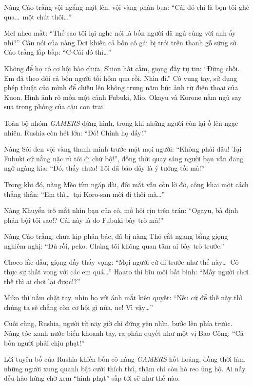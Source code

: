 \documentclass[../main.tex]{subfiles}
\begin{document}
Nàng Cáo trắng vội ngẩng mặt lên, vội vàng phân bua: ``Cái đó chỉ là bọn tôi ghé qua\dots\ một chút thôi\dots''

Mel nheo mắt: ``Thế sao tôi lại nghe nói là bốn người đã ngủ cùng với anh ấy nhỉ?'' Câu nói của nàng Dơi khiến cả bốn cô gái bị trói trên thanh gỗ sững sờ. Cáo trắng lắp bắp: ``C-Cái đó thì\dots''

Không để họ có cơ hội bào chữa, Shion hất cằm, giọng đầy tự tin: ``Đừng chối. Em đã theo dõi cả bốn người tối hôm qua rồi. Nhìn đi.'' Cô vung tay, sử dụng phép thuật của mình để chiếu lên không trung năm bức ảnh từ điện thoại của Kuon. Hình ảnh rõ mồn một cảnh Fubuki, Mio, Okayu và Korone nằm ngủ say sưa trong phòng của cậu con trai.

Toàn bộ nhóm \textit{GAMERS} đứng hình, trong khi những người còn lại ồ lên ngạc nhiên. Rushia còn hét lớn: ``Đó! Chính họ đấy!''

Nàng Sói đen vội vàng thanh minh trước mặt mọi người: ``Không phải đâu! Tại Fubuki cứ nằng nặc rủ tôi đi chứ bộ!'', đồng thời quay sáng người bạn vẫn đang ngỡ ngàng kia: ``Đó, thấy chưa! Tôi đã bảo đây là ý tưởng tồi mà!''

Trong khi đó, nàng Mèo tím ngáp dài, đôi mắt vẫn còn lờ đờ, công khai một cách thẳng thắn: ``Em thì\dots\ tại Koro-san mời đi thôi mà\dots''

Nàng Khuyển trố mắt nhìn bạn của cô, mồ hôi rịn trên trán: ``Ogayu, bà định phản bội tôi sao!? Cái này là do Fubuki bày trò mà!''

Nàng Cáo trắng, chưa kịp phản bác, đã bị nàng Thỏ cắt ngang bằng giọng nghiêm nghị: ``Đủ rồi, peko. Chúng tôi không quan tâm ai bày trò trước.''

Choco lắc đầu, giọng đầy thấy vọng: ``Mọi người cứ đi trước như thế này\dots\ Cô thực sự thất vọng với các em quá\dots'' Haato thì bĩu môi bất bình: ``Mấy người chơi thế thì ai chơi lại được!?''

Miko thì nắm chặt tay, nhìn họ với ánh mắt kiên quyết: ``Nếu cứ để thế này thì chúng ta sẽ chằng còn cơ hội gì nữa, ne! Vì vậy\dots''

Cuối cùng, Rushia, người từ nãy giờ chỉ đứng yên nhìn, bước lên phía trước. Nàng tóc xanh nước biển khoanh tay, ra phán quyết như một vị Bao Công: ``Cả bốn người phải chịu phạt!''

Lời tuyên bố của Rushia khiến bốn cô nàng \textit{GAMERS} hốt hoảng, đồng thời làm những người xung quanh bật cười thích thú, thậm chí còn hò reo ủng hộ. Ai nấy đều hào hứng chờ xem ``hình phạt'' sắp tới sẽ như thế nào.
\end{document}
